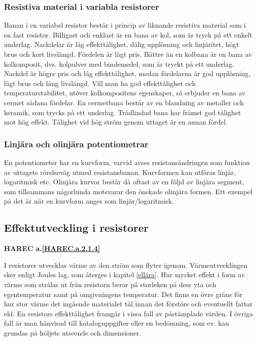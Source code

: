 \subsubsection{Resistiva material i variabla resistorer}

Banan i en variabel resistor består i princip av liknande resistiva material
som i en fast resistor. Billigast och enklast är en bana av kol, som är tryck
på ett enkelt underlag. Nackdelar är låg effekttålighet, dålig upplösning och
linjäritet, högt brus och kort livslängd. Fördelen är lågt pris.
Bättre än en kolbana är en bana av kolkomposit, dvs. kolpulver med bindemedel,
som är tryckt på ett underlag. Nackdel är högre pris och låg effekttålighet,
medan fördelarna är god upplösning, lågt brus och lång livslängd.
Vill man ha god effekttålighet och temperaturstabilitet, utöver kolkompositens
egenskaper, så erbjuder en bana av cermet sådana fördelar. En cermetbana består
av en blandning av metaller och keramik, som trycks på ett underlag.
Trådlindad bana har främst god tålighet mot hög effekt. Tålighet vid hög ström
genom uttaget är en annan fördel.

\subsubsection{Linjära och olinjära potentiometrar}

En potentiometer har en kurvform, varvid avses resistansändringen som funktion
av uttagets rörelseväg utmed resistansbanan. Kurvformen kan utföras linjär,
logaritmisk etc. Olinjära kurvor består då oftast av en följd av linjära
segment, som tillsammans någorlunda motsvarar den önskade olinjära formen. Ett
exempel på det är när en kurvform anges som linjär/logaritmisk.

\subsection{Effektutveckling i resistorer}
\textbf{HAREC a.\ref{HAREC.a.2.1.4}\label{myHAREC.a.2.1.4}}

I resistorer utvecklas värme av den ström som flyter igenom. Värmeutvecklingen
sker enligt Joules lag, som återges i kapitel \ref{ellära}. Hur mycket effekt i form av
värme som strålas ut från resistorn beror på storleken på dess yta och
egentemperatur samt på omgivningens temperatur. Det finns en övre gräns för hur
stor värme det ingående materialet tål innan det förstörs och eventuellt fattar
eld. En resistors effekttålighet framgår i vissa fall av påstämplade värden.
I övriga fall är man hänvisad till kataloguppgifter eller en bedömning, som ev.
kan grundas på höljets utseende och dimensioner.

